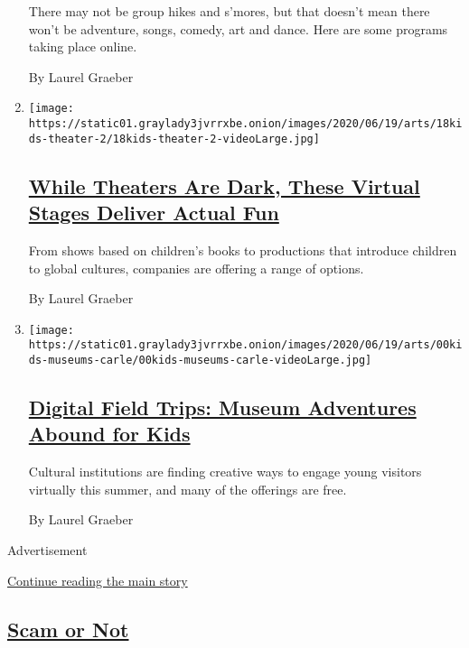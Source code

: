 \begin{enumerate}
  There may not be group hikes and s'mores, but that doesn't mean there
  won't be adventure, songs, comedy, art and dance. Here are some
  programs taking place online.

  By Laurel Graeber
\item
  \texttt{[image: https://static01.graylady3jvrrxbe.onion/images/2020/06/19/arts/18kids-theater-2/18kids-theater-2-videoLarge.jpg]}

  \hypertarget{while-theaters-are-dark-these-virtual-stages-deliver-actual-fun}{%
  \subsection{\texorpdfstring{\href{/2020/06/18/theater/kids-summer-theater-virtual.html}{While
  Theaters Are Dark, These Virtual Stages Deliver Actual
  Fun}}{While Theaters Are Dark, These Virtual Stages Deliver Actual Fun}}\label{while-theaters-are-dark-these-virtual-stages-deliver-actual-fun}}

  From shows based on children's books to productions that introduce
  children to global cultures, companies are offering a range of
  options.

  By Laurel Graeber
\item
  \texttt{[image: https://static01.graylady3jvrrxbe.onion/images/2020/06/19/arts/00kids-museums-carle/00kids-museums-carle-videoLarge.jpg]}

  \hypertarget{digital-field-trips-museum-adventures-abound-for-kids}{%
  \subsection{\texorpdfstring{\href{/2020/06/18/arts/design/kids-museums-summer-virus.html}{Digital
  Field Trips: Museum Adventures Abound for
  Kids}}{Digital Field Trips: Museum Adventures Abound for Kids}}\label{digital-field-trips-museum-adventures-abound-for-kids}}

  Cultural institutions are finding creative ways to engage young
  visitors virtually this summer, and many of the offerings are free.

  By Laurel Graeber
\end{enumerate}

Advertisement

\protect\hyperlink{after-mid2}{Continue reading the main story}

\hypertarget{scam-or-not}{%
\subsection{\texorpdfstring{\href{/column/scam-or-not}{Scam or
Not}}{Scam or Not}}\label{scam-or-not}}

